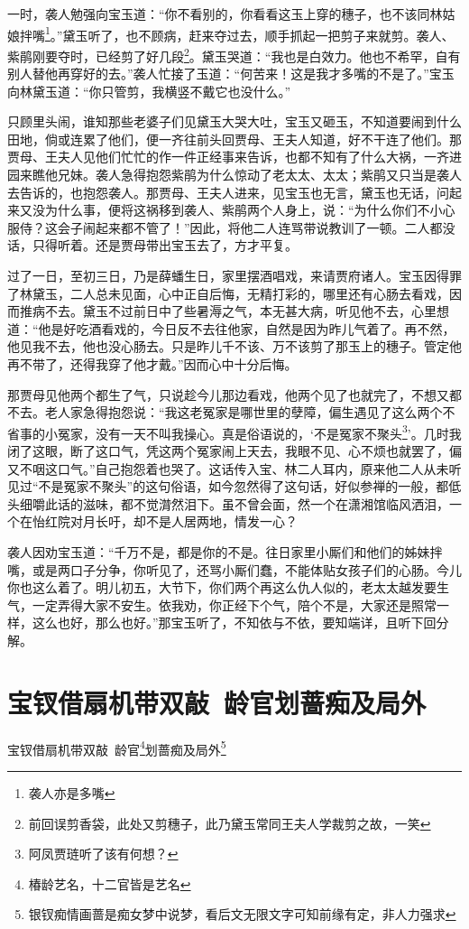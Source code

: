 \documentclass[12pt,oneside]{book}
\begin{document}
一时，袭人勉强向宝玉道：“你不看别的，你看看这玉上穿的穗子，也不该同林姑娘拌嘴\footnote{袭人亦是多嘴}。”黛玉听了，也不顾病，赶来夺过去，顺手抓起一把剪子来就剪。袭人、紫鹃刚要夺时，已经剪了好几段\footnote{前回误剪香袋，此处又剪穗子，此乃黛玉常同王夫人学裁剪之故，一笑}。黛玉哭道：“我也是白效力。他也不希罕，自有别人替他再穿好的去。”袭人忙接了玉道：“何苦来！这是我才多嘴的不是了。”宝玉向林黛玉道：“你只管剪，我横竖不戴它也没什么。”

只顾里头闹，谁知那些老婆子们见黛玉大哭大吐，宝玉又砸玉，不知道要闹到什么田地，倘或连累了他们，便一齐往前头回贾母、王夫人知道，好不干连了他们。那贾母、王夫人见他们忙忙的作一件正经事来告诉，也都不知有了什么大祸，一齐进园来瞧他兄妹。袭人急得抱怨紫鹃为什么惊动了老太太、太太；紫鹃又只当是袭人去告诉的，也抱怨袭人。那贾母、王夫人进来，见宝玉也无言，黛玉也无话，问起来又没为什么事，便将这祸移到袭人、紫鹃两个人身上，说：“为什么你们不小心服侍？这会子闹起来都不管了！”因此，将他二人连骂带说教训了一顿。二人都没话，只得听着。还是贾母带出宝玉去了，方才平复。

过了一日，至初三日，乃是薛蟠生日，家里摆酒唱戏，来请贾府诸人。宝玉因得罪了林黛玉，二人总未见面，心中正自后悔，无精打彩的，哪里还有心肠去看戏，因而推病不去。黛玉不过前日中了些暑溽之气，本无甚大病，听见他不去，心里想道：“他是好吃酒看戏的，今日反不去往他家，自然是因为昨儿气着了。再不然，他见我不去，他也没心肠去。只是昨儿千不该、万不该剪了那玉上的穗子。管定他再不带了，还得我穿了他才戴。”因而心中十分后悔。

那贾母见他两个都生了气，只说趁今儿那边看戏，他两个见了也就完了，不想又都不去。老人家急得抱怨说：“我这老冤家是哪世里的孽障，偏生遇见了这么两个不省事的小冤家，没有一天不叫我操心。真是俗语说的，‘不是冤家不聚头\footnote{阿凤贾琏听了该有何想？}’。几时我闭了这眼，断了这口气，凭这两个冤家闹上天去，我眼不见、心不烦也就罢了，偏又不咽这口气。”自己抱怨着也哭了。这话传入宝、林二人耳内，原来他二人从未听见过“不是冤家不聚头”的这句俗语，如今忽然得了这句话，好似参禅的一般，都低头细嚼此话的滋味，都不觉潸然泪下。虽不曾会面，然一个在潇湘馆临风洒泪，一个在怡红院对月长吁，却不是人居两地，情发一心？

袭人因劝宝玉道：“千万不是，都是你的不是。往日家里小厮们和他们的姊妹拌嘴，或是两口子分争，你听见了，还骂小厮们蠢，不能体贴女孩子们的心肠。今儿你也这么着了。明儿初五，大节下，你们两个再这么仇人似的，老太太越发要生气，一定弄得大家不安生。依我劝，你正经下个气，陪个不是，大家还是照常一样，这么也好，那么也好。”那宝玉听了，不知依与不依，要知端详，且听下回分解。

 
\chapter{宝钗借扇机带双敲~龄官划蔷痴及局外}
宝钗借扇机带双敲~龄官\footnote{椿龄艺名，十二官皆是艺名}划蔷痴及局外\footnote{银钗痴情画蔷是痴女梦中说梦，看后文无限文字可知前缘有定，非人力强求}
\end{document}
